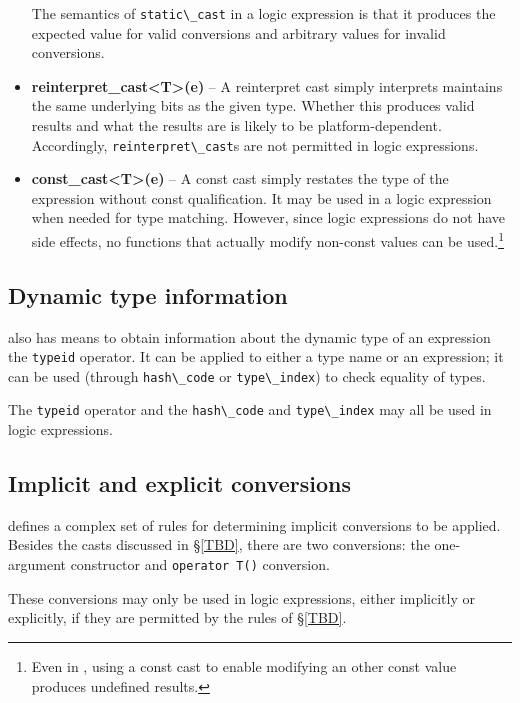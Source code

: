 \begin{itemize}
	The semantics of \lstinline|static\_cast| in a logic expression is that it produces the expected value for valid conversions and arbitrary values for invalid conversions.
	
	\item \textbf{reinterpret\_cast<T>(e)} -- A reinterpret cast simply interprets maintains the same underlying bits as the given type. 
	Whether this produces valid results and what the results are is likely to be platform-dependent. 
	Accordingly, \lstinline|reinterpret\_cast|s are not permitted in logic expressions.
	
	\item \textbf{const\_cast<T>(e)} -- A const cast simply restates the type of the expression without const qualification. 
	It may be used in a logic expression when needed for type matching. 
	However, since logic expressions do not have side effects, no functions that actually modify non-const values can be used.\footnote{Even in \lang{}, using a const cast to enable modifying an other const value produces undefined results.}
	
	

\end{itemize}
\subsection{Dynamic type information}

\lang{} also has means to obtain information about the dynamic
type of an expression the \lstinline|typeid| operator. It can be applied to either a type name or an expression; it can be used (through \lstinline|hash\_code| or \lstinline|type\_index|) to check equality of types.

The  \lstinline|typeid| operator and the \lstinline|hash\_code| and \lstinline|type\_index| may all be used in logic expressions.

\subsection{Implicit and explicit conversions}

\lang{} defines a complex set of rules for determining implicit conversions to be applied. Besides the casts discussed in \S\ref{TBD}, there are two conversions: the one-argument constructor and \lstinline|operator T()| conversion. 

These conversions may only be used in logic expressions, either implicitly or explicitly, if they are permitted by the rules of \S\ref{TBD}. 
